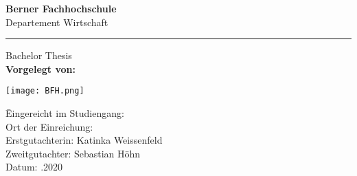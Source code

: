 \begin{titlepage}
    \textbf{Berner Fachhochschule}\\
    Departement Wirtschaft 
    \par\noindent\rule{\textwidth}{0.4pt}
    \begin{center}
        \Huge
        \textbf{}

        \vspace{0.5cm}

        \LARGE
        

        \vspace{1.5cm}
        Bachelor Thesis\\
        \textbf{Vorgelegt von: }

        \vfill
        

        \vspace{2cm}

        \texttt{[image: BFH.png]}
        \large
        \begin{tabbing}
            \qquad \= Eingereicht im Studiengang: \qquad \qquad \qquad  \= \\
            \> Ort der Einreichung:  \> \\
            \> Erstgutachterin: \> Katinka Weissenfeld \\
            \> Zweitgutachter: \> Sebastian Höhn \\
            \> Datum: .2020
        \end{tabbing}
        
    \end{center}
\end{titlepage}